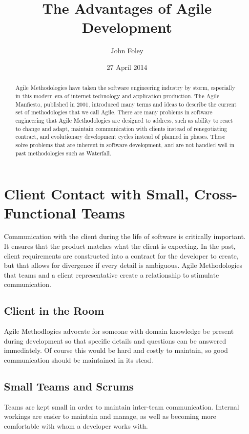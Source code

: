 \documentclass[11pt]{article}
\title{The Advantages of Agile Development}
\author{John Foley}
\date{27 April 2014}
\begin{document}
\maketitle

\thispagestyle{empty}

\begin{abstract}
  Agile Methodologies have taken the software engineering industry by storm, especially in this modern
  era of internet technology and application production. The Agile Manfiesto, published in 2001,
 introduced many terms and ideas to describe the current set of methodologies that we call Agile. There are many
 problems in software engineering that Agile Methodologies are designed to address, such as ability to react to 
 change and adapt, maintain communication with clients instead of renegotiating contract, and evolutionary development cycles
 instead of planned in phases. These solve problems that are inherent in software development, and are not handled well in past
 methodologies such as Waterfall. 
\end{abstract}

\section{Client Contact with Small, Cross-Functional Teams}

Communication with the client during the life of software is critically important. It ensures that the product matches
what the client is expecting. In the past, client requirements are constructed into a contract for the developer to create,
but that allows for divergence if every detail is ambiguous.  Agile Methodologies that teams and a client representative
create a relationship to stimulate communication.

\subsection{Client in the Room}
Agile Methodlogies advocate for someone with domain knowledge be present during development so that specific details and 
questions can be answered immediately. Of course this would be hard and costly to maintain, so good communication 
should be maintained in its stead.

\subsection{Small Teams and Scrums}
Teams are kept small in order to maintain inter-team communication. Internal workings are easier to maintain and manage,
as well as becoming more comfortable with whom a developer works with.
\end{document}
